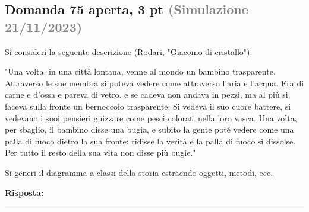 \documentclass[a4paper,11pt]{article}
\begin{document}
\subsection*{Domanda 75 \hfill {\small aperta, 3 pt \textcolor{gray}{(Simulazione 21/11/2023)}}}
\begin{tcolorbox}[colback=gray!8,colframe=gray!50,title=Contesto]
Si consideri la seguente descrizione (Rodari, "Giacomo di cristallo"):

"Una volta, in una città lontana, venne al mondo un bambino trasparente. Attraverso le sue membra si poteva vedere come attraverso l'aria e l'acqua. Era di carne e d'ossa e pareva di vetro, e se cadeva non andava in pezzi, ma al più si faceva sulla fronte un bernoccolo trasparente. Si vedeva il suo cuore battere, si vedevano i suoi pensieri guizzare come pesci colorati nella loro vasca. Una volta, per sbaglio, il bambino disse una bugia, e subito la gente poté vedere come una palla di fuoco dietro la sua fronte: ridisse la verità e la palla di fuoco si dissolse. Per tutto il resto della sua vita non disse più bugie."
\end{tcolorbox}
Si generi il diagramma a classi della storia estraendo oggetti, metodi, ecc.

\vspace{0.2cm}
\noindent\textbf{Risposta:}\par
\vspace{4cm}\hrule


\end{document}

